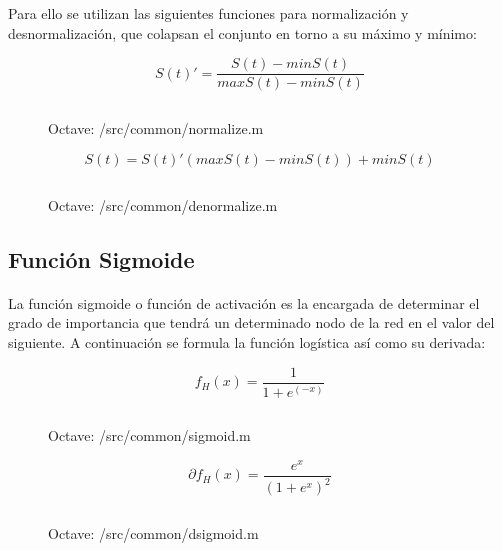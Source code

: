 \documentclass[10pt, a4paper,spanish]{article}
\begin{document}
			Para ello se utilizan las siguientes funciones para normalización y desnormalización, que colapsan el conjunto en torno a su máximo y mínimo:

			\begin{equation}
				S(t)' = \frac{S(t) - min S(t)}{max S(t)- min S(t)}
			\end{equation}

			\begin{figure}[htpb!]
				\centering
				\inputminted{octave}{../src/common/normalize.m}
				\caption{Octave: /src/common/normalize.m}
				\label{code:normalize}
			\end{figure}


			\begin{equation}
				S(t) = S(t)' (max S(t)- min S(t)) + min S(t)
			\end{equation}

			\begin{figure}[htpb!]
				\centering
				\inputminted{octave}{../src/common/denormalize.m}
				\caption{Octave: /src/common/denormalize.m}
				\label{code:denormalize}
			\end{figure}

		\subsection{Función Sigmoide}
			\paragraph{}
			La función sigmoide o función de activación es la encargada de determinar el grado de importancia que tendrá un determinado nodo de la red en el valor del siguiente. A continuación se formula la función logística así como su derivada:

			\begin{equation}
				f_H(x) = \frac{1}{1+e^(-x)}
			\end{equation}

			\begin{figure}[htpb!]
				\centering
				\inputminted{octave}{../src/common/sigmoid.m}
				\caption{Octave: /src/common/sigmoid.m}
				\label{code:sigmoid}
			\end{figure}

			\begin{equation}
				\partial f_H(x) = \frac{e^x}{(1 + e^x)^2}
			\end{equation}


			\begin{figure}[htpb!]
				\centering
				\inputminted{octave}{../src/common/dsigmoid.m}
				\caption{Octave: /src/common/dsigmoid.m}
				\label{code:dsigmoid}
			\end{figure}
\end{document}
